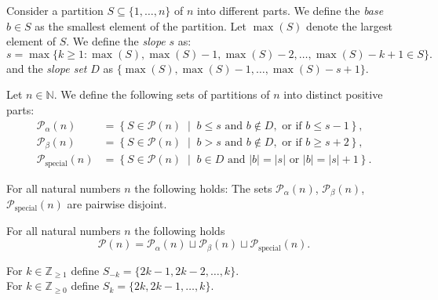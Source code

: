 \begin{definition} \leanok
  Consider a partition $S \subseteq \{1, \ldots, n\}$ of $n$ into different parts. We define the \emph{base} $b \in S$ as the smallest element of the partition. Let $\max(S)$ denote the largest element of $S$. We define the \emph{slope} $s$ as:
  \begin{equation*}
      s = \max\{k \geq 1 : \max(S), \max(S)-1, \max(S)-2, \ldots, \max(S)-k + 1 \in S\}.
  \end{equation*}
  and the \emph{slope set} $D$ as $\{\max(S), \max(S)-1, \ldots, \max(S)-s + 1\}$.
\end{definition}

\begin{definition} \leanok Let $n \in \mathbb{N}$. We define the following sets of partitions of $n$ into distinct positive parts:
\begin{align*}
\mathcal{P}_{\alpha}(n) &= \left\{ S \in \mathcal{P}(n) \;\middle|\;  b \leq s \mbox{ and } b \notin D, \mbox{ or if } b \leq s - 1\right\}, \\
\mathcal{P}_{\beta}(n) &= \left\{ S \in \mathcal{P}(n) \;\middle|\; b > s \mbox{ and } b \notin D, \mbox{ or if } b \geq s + 2 \right\}, \\
\mathcal{P}_{\mathrm{special}}(n)  &= \left\{ S \in \mathcal{P}(n) \;\middle|\; b\in D \mbox{ and } |b|=|s| \mbox{ or } |b|=|s|+1   \right\}.
\end{align*}
\end{definition}

\begin{lemma} \leanok For all natural numbers $n$ the following holds: The sets $\mathcal{P}_{\alpha}(n)$, $\mathcal{P}_{\beta}(n)$,  $\mathcal{P}_{\mathrm{special}}(n)$ are pairwise disjoint.
\end{lemma}

\begin{lemma} \label{lemma: alpha beta special} \leanok For all natural numbers $n$ the following holds $$\mathcal{P}(n)=\mathcal{P}_{\alpha}(n)\sqcup\mathcal{P}_{\beta}(n)\sqcup\mathcal{P}_{\mathrm{special}}(n).$$
\end{lemma}

\begin{definition} \leanok
For $k\in\mathbb{Z}_{\geq 1}$ define $ S_{-k}=\{2k-1 , 2k-2 , \ldots , k\}$.\\
For $k\in\mathbb{Z}_{\geq 0}$ define $S_{k}=\{2k , 2k-1 , \ldots , k\}$.
\end{definition}

